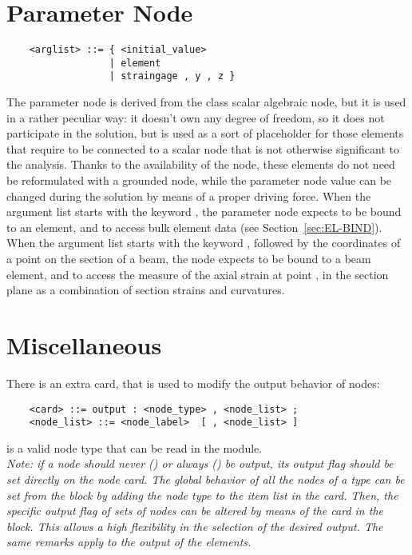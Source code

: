 \section{Parameter Node}
\begin{verbatim}
    <arglist> ::= { <initial_value>
                  | element 
                  | straingage , y , z }
\end{verbatim}
The parameter node is derived from the class scalar algebraic node, but it
is used in a rather peculiar way: it doesn't own any degree of freedom,
so it does not participate in the solution, but is used as a sort of
placeholder for those elements that require to be connected to a scalar node
that is not otherwise significant to the analysis.
Thanks to the availability of the  node, these elements
do not need be reformulated with a grounded node, while the parameter
node value can be changed during the solution by means of a proper driving 
force.
When the argument list starts with the keyword , the parameter
node expects to be bound to an element, and to access bulk element data 
(see Section~\ref{sec:EL-BIND}).
When the argument list starts with the keyword , followed by
the coordinates of a point on the section of a beam, the 
node expects to be bound to a beam element, and to access the measure of
the axial strain at point ,  in the section plane as a
combination of section strains and curvatures.





\section{Miscellaneous}
There is an extra card, that is used to modify the output behavior of nodes:  
\begin{verbatim}
    <card> ::= output : <node_type> , <node_list> ;
    <node_list> ::= <node_label>  [ , <node_list> ]
\end{verbatim}
 is a valid node type that can be read in the 
module. \\
{\em
   Note: if a node should never () or always () be output,
   its output flag should be set directly on the node card. 
   The global behavior of all the nodes of a type can be set from the 
    block by adding the node type to the item list in the 
    card. 
   Then, the specific output flag of sets of nodes can be altered by means 
   of the  card in the  block. 
   This allows a high flexibility in the selection of the desired output. 
   The same remarks apply to the output of the elements.
}



